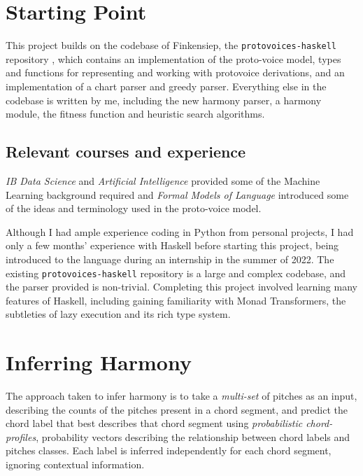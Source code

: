 \documentclass[12pt,a4paper,twoside,openany]{report} \usepackage[pdfborder={0 0 0}]{hyperref}    %
\theoremstyle{definition} \newtheorem{definition}{Definition}[section]
\begin{document}
\section{Starting Point}
\label{sec:startingPoint}


This project builds on the codebase of Finkensiep, the \texttt{protovoices-haskell}
repository \cite{finkensiepProtovoicesModelTonal2021}, which contains an implementation 
of the proto-voice model, types and functions for representing and working with protovoice derivations, and an
implementation of a chart parser and greedy parser. Everything else in the codebase is written by me, including the new
harmony parser, a harmony module, the fitness function and heuristic search algorithms.  


\subsection{Relevant courses and experience}
\label{sub:coursesExperience}

\textit{IB Data Science} and \textit{Artificial Intelligence} provided some of the Machine Learning background required
and \textit{Formal Models of Language} introduced some of the ideas and terminology used in the proto-voice model.

Although I had ample experience coding in Python from personal projects, I had only a few months' experience with Haskell before starting this project, being introduced to the language during an internship in the summer of 2022. 
The existing \texttt{protovoices-haskell} repository is a large and complex codebase, and the parser provided is non-trivial. 
Completing this project involved learning many features of Haskell, including gaining familiarity with Monad Transformers, the subtleties of lazy execution and its rich type system.


\section{Inferring Harmony}
\label{sec:inferringHarmony}

The approach taken to infer harmony is to take a \textit{multi-set} of pitches as an input, describing the counts of the
pitches present in a chord segment, and predict the chord label that best describes that chord segment using
\textit{probabilistic chord-profiles}, probability vectors describing the relationship between chord labels and pitches
classes.
Each label is inferred independently for each chord segment, ignoring contextual information.
\end{document}
